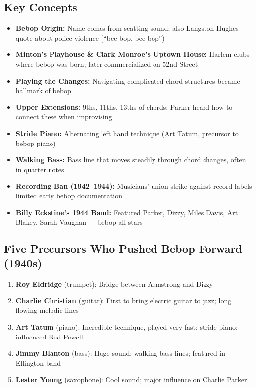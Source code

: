 \documentclass[11pt, letterpaper]{article}
\begin{document}
\subsection{Key Concepts}
\begin{itemize}
    \item \textbf{Bebop Origin:} Name comes from scatting sound; also Langston Hughes quote about police violence (``bee-bop, bee-bop'')
    \item \textbf{Minton's Playhouse \& Clark Monroe's Uptown House:} Harlem clubs where bebop was born; later commercialized on 52nd Street
    \item \textbf{Playing the Changes:} Navigating complicated chord structures became hallmark of bebop
    \item \textbf{Upper Extensions:} 9ths, 11ths, 13ths of chords; Parker heard how to connect these when improvising
    \item \textbf{Stride Piano:} Alternating left hand technique (Art Tatum, precursor to bebop piano)
    \item \textbf{Walking Bass:} Bass line that moves steadily through chord changes, often in quarter notes
    \item \textbf{Recording Ban (1942--1944):} Musicians' union strike against record labels limited early bebop documentation
    \item \textbf{Billy Eckstine's 1944 Band:} Featured Parker, Dizzy, Miles Davis, Art Blakey, Sarah Vaughan --- bebop all-stars
\end{itemize}

\subsection{Five Precursors Who Pushed Bebop Forward (1940s)}
\begin{enumerate}
    \item \textbf{Roy Eldridge} (trumpet): Bridge between Armstrong and Dizzy
    \item \textbf{Charlie Christian} (guitar): First to bring electric guitar to jazz; long flowing melodic lines
    \item \textbf{Art Tatum} (piano): Incredible technique, played very fast; stride piano; influenced Bud Powell
    \item \textbf{Jimmy Blanton} (bass): Huge sound; walking bass lines; featured in Ellington band
    \item \textbf{Lester Young} (saxophone): Cool sound; major influence on Charlie Parker
\end{enumerate}
\end{document}
